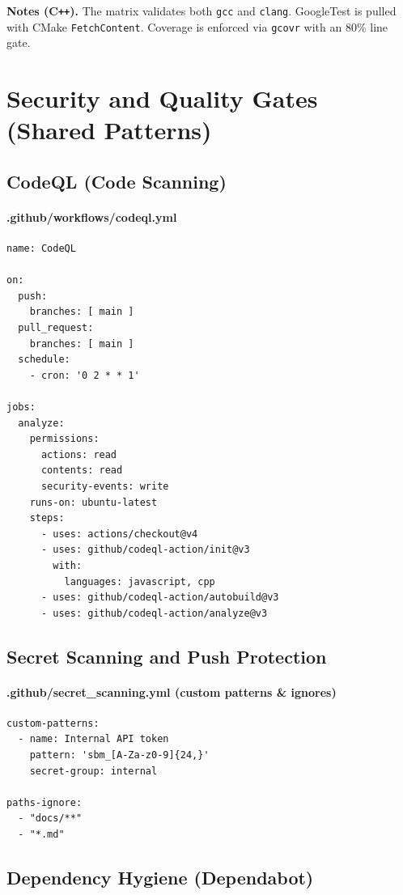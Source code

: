 \documentclass[11pt]{article}
\begin{document}
\begin{tcolorbox}
\textbf{Notes (C\texttt{++}).} The matrix validates both \texttt{gcc} and \texttt{clang}. GoogleTest is pulled with CMake \texttt{FetchContent}. Coverage is enforced via \texttt{gcovr} with an 80\% line gate.
\end{tcolorbox}

\section{Security and Quality Gates (Shared Patterns)}
\subsection{CodeQL (Code Scanning)}
\paragraph{.github/workflows/codeql.yml}
\begin{verbatim}
name: CodeQL

on:
  push:
    branches: [ main ]
  pull_request:
    branches: [ main ]
  schedule:
    - cron: '0 2 * * 1'

jobs:
  analyze:
    permissions:
      actions: read
      contents: read
      security-events: write
    runs-on: ubuntu-latest
    steps:
      - uses: actions/checkout@v4
      - uses: github/codeql-action/init@v3
        with:
          languages: javascript, cpp
      - uses: github/codeql-action/autobuild@v3
      - uses: github/codeql-action/analyze@v3
\end{verbatim}

\subsection{Secret Scanning and Push Protection}
\paragraph{.github/secret\_scanning.yml (custom patterns \& ignores)}
\begin{verbatim}
custom-patterns:
  - name: Internal API token
    pattern: 'sbm_[A-Za-z0-9]{24,}'
    secret-group: internal

paths-ignore:
  - "docs/**"
  - "*.md"
\end{verbatim}

\subsection{Dependency Hygiene (Dependabot)}
\end{document}
